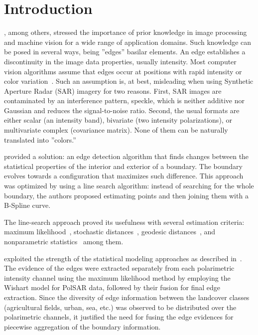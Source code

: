 \documentclass[remotesensing,article,submit,pdftex,moreauthors]{Definitions/mdpi}
\begin{document}
\section{Introduction}
\citet{ActiveContours}, among others, stressed the importance of prior knowledge in image processing and machine vision for a wide range of application domains.
Such knowledge can be posed in several ways, being ''edges'' basilar elements. 
An edge establishes a discontinuity in the image data properties, usually intensity.
Most computer vision algorithms assume that edges occur at positions with rapid intensity or color variation~\citep{ComputerVisionAlgorithmsandApplications}.
Such an assumption is, at best, misleading when using Synthetic Aperture Radar (SAR) imagery for two reasons.
First, SAR images are contaminated by an interference pattern, speckle, which is neither additive nor Gaussian and reduces the signal-to-noise ratio.
Second, the usual formats are either scalar (an intensity band), bivariate (two intensity polarizations), or multivariate complex (covariance matrix).
None of them can be naturally translated into ''colors.''

\citet{Gambinietal:IJRS:06} provided a solution: an edge detection algorithm that finds changes between the statistical properties of the interior and exterior of a boundary.
The boundary evolves towards a configuration that maximizes such difference.
This approach was optimized by \citet{Gambini:StatisticsComputing} using a line search algorithm: instead of searching for the whole boundary, the authors proposed estimating points and then joining them with a B-Spline curve.

The line-search approach proved its usefulness with several estimation criteria:
maximum likelihood~\citep{PolarimetricSegmentationBSplinesMSSP},
stochastic distances~\citep{EdgeDetectionDistancesEntropiesJSTARS},
geodesic distances~\citep{GeodesicDistanceGI0JSTARS},
and nonparametric statistics~\citep{NonparametricEdgeDetectionSpeckledImagery} among them.


\citet{FusionofEvidencesinIntensitiesChannelsforEdgeDetectioninPolSARImages} exploited the strength of the statistical modeling approaches as described in~\citep{Gambini:StatisticsComputing,PolarimetricSegmentationBSplinesMSSP,EdgeDetectionDistancesEntropiesJSTARS}. 
The evidence of the edges were extracted separately from each polarimetric intensity channel using the maximum likelihood method by employing the Wishart model for PolSAR data, followed by their fusion for final edge extraction. 
Since the diversity of edge information between the landcover classes (agricultural fields, urban, sea, etc.) was observed to be distributed over the polarimetric channels, it justified the need for fusing the edge evidences for piecewise aggregation of the boundary information. 
\end{document}
